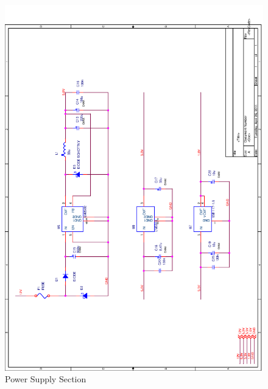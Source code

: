 \documentclass[11pt]{report} %
\begin{document}
	\begin{figure}[H]
		\centering
		\includegraphics[scale=0.50]{images/final_powersupply.png}
		\caption{Power Supply Section}\label{fig:powersupply_board}
	\end{figure}
\end{document}
